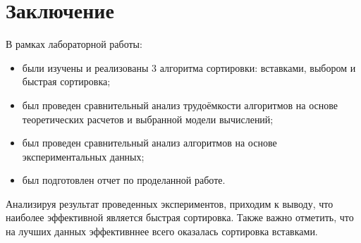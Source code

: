 \chapter*{Заключение}

В рамках лабораторной работы:
\begin{itemize}
	\item были изучены и реализованы 3 алгоритма сортировки: вставками, выбором и быстрая сортировка;
	\item был проведен сравнительный анализ трудоёмкости алгоритмов на основе теоретических расчетов и выбранной модели вычислений;
	\item был проведен сравнительный анализ алгоритмов на основе экспериментальных данных;
    \item был подготовлен отчет по проделанной работе.
\end{itemize}

Анализируя результат проведенных экспериментов, приходим к выводу, что наиболее эффективной является быстрая сортировка. Также важно отметить, что на лучших данных эффективннее всего оказалась сортировка вставками.
